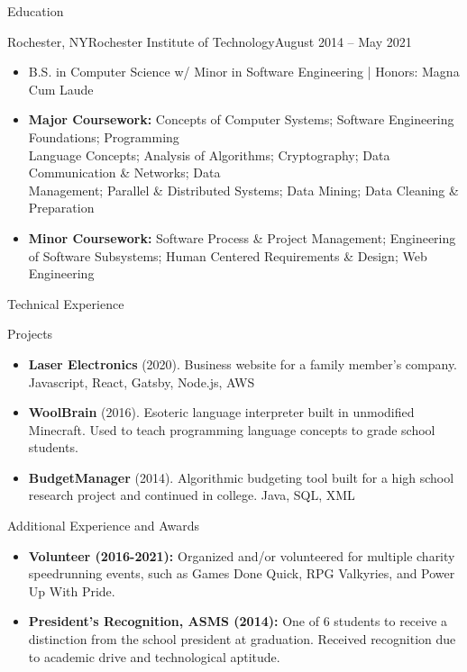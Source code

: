 \documentclass[]{mcdowellcv}
\begin{document}
	\begin{cvsection}{Education}
		\begin{cvsubsection}{Rochester, NY}{Rochester Institute of Technology}{August 2014 -- May 2021}
			\begin{itemize}
				\item B.S. in Computer Science w/ Minor in Software Engineering | Honors: Magna Cum Laude
				\item \textbf{Major Coursework:} Concepts of Computer Systems; Software Engineering Foundations; Programming \\Language Concepts; Analysis of Algorithms; Cryptography; Data Communication \& Networks; Data \\Management; Parallel \& Distributed Systems; Data Mining; Data Cleaning \& Preparation
				\item \textbf{Minor Coursework:} Software Process \& Project Management; Engineering of Software Subsystems; Human Centered Requirements \& Design; Web Engineering
			\end{itemize}
		\end{cvsubsection}
	\end{cvsection}
	
	\begin{cvsection}{Technical Experience}
		\begin{cvsubsection}{Projects}{}{}
			\begin{itemize}
				\item \textbf{Laser Electronics} (2020). Business website for a family member's company.  Javascript, React, Gatsby, Node.js, AWS
				\item \textbf{WoolBrain} (2016). Esoteric language interpreter built in unmodified Minecraft. Used to teach programming language concepts to grade school students.
				\item \textbf{BudgetManager} (2014). Algorithmic budgeting tool built for a high school research project and continued in college. Java, SQL, XML
			\end{itemize}
		\end{cvsubsection}
	\end{cvsection}
	
	\begin{cvsection}{Additional Experience and Awards}
		\begin{cvsubsection}{}{}{}	
			\begin{itemize}
				\item \textbf{Volunteer (2016-2021):} Organized and/or volunteered for multiple charity speedrunning events, such as Games Done Quick, RPG Valkyries, and Power Up With Pride.
				\item \textbf{President's Recognition, ASMS (2014):} One of 6 students to receive a distinction from the school president at graduation. Received recognition due to academic drive and technological aptitude.
			\end{itemize}
		\end{cvsubsection}
	\end{cvsection}
	
\end{document}
